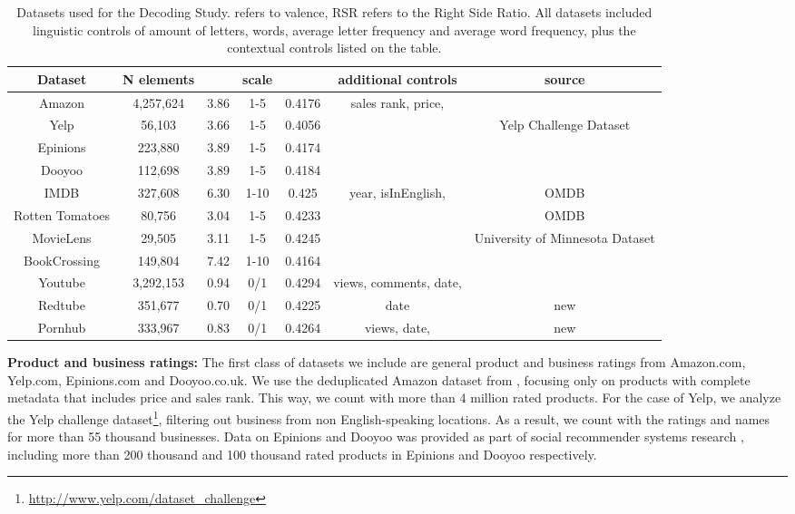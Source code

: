 \documentclass[letterpaper]{sig-alternate-2013}
\begin{document}
\begin{table*}[bp]
\begin{center}
    \begin{tabular}{c|c|c|c|c|c|c}
Dataset &   N elements &  & scale &  & additional controls & source \\ \hline

Amazon & 4,257,624 & 3.86 & 1-5 & 0.4176 & sales rank, price,  & \cite{Mcauley2015,Mcauley2015b} \\
Yelp & 56,103 & 3.66 & 1-5 & 0.4056 &  & Yelp Challenge Dataset \\
Epinions & 223,880 & 3.89 & 1-5 &  0.4174 &   & \cite{Tanase2013} \\
Dooyoo & 112,698 & 3.89 & 1-5 &  0.4184 &  & \cite{Tanase2013} \\
IMDB & 327,608 & 6.30 & 1-10 & 0.425  &  year, isInEnglish,  & OMDB\cite{Fritz2015} \\
Rotten Tomatoes & 80,756 & 3.04 & 1-5 & 0.4233 &  &  OMDB\cite{Fritz2015} \\
MovieLens & 29,505 & 3.11 & 1-5  & 0.4245 &   & University of Minnesota Dataset\\ BookCrossing & 149,804 & 7.42 & 1-10  & 0.4164 &  & \cite{Ziegler2005} \\
Youtube & 3,292,153 & 0.94 & 0/1 & 0.4294 & views, comments, date,  & \cite{Abisheva2014} \\
Redtube & 351,677 & 0.70 & 0/1 & 0.4225 & date & new \\
Pornhub & 333,967 & 0.83 & 0/1 & 0.4264  & views, date,  & new\\
	  \end{tabular}
\end{center}
  \caption{Datasets used for the Decoding Study.  refers to valence, RSR refers to the Right Side Ratio.
All datasets included linguistic controls of amount of letters, words, average letter frequency and average word frequency, plus the contextual controls listed on the table.  \label{tab:data1}}
\end{table*}


\textbf{Product and business ratings:} The first class of datasets we
include are general product and business ratings from Amazon.com, Yelp.com,
Epinions.com and Dooyoo.co.uk. We use the deduplicated Amazon dataset from
\cite{Mcauley2015,Mcauley2015b}, focusing only on products with complete
metadata that includes price and sales rank. This way, we count with more than
4 million rated products. For the case of Yelp, we analyze the Yelp challenge
dataset\footnote{\url{http://www.yelp.com/dataset_challenge}}, filtering out business from non English-speaking
locations. As a result, we count with the ratings and names for more than 55
thousand businesses.  Data on Epinions and Dooyoo was provided as part of
social recommender systems research \cite{Tanase2013}, including more than 200
thousand and 100 thousand rated products in Epinions and Dooyoo respectively.
\end{document}
